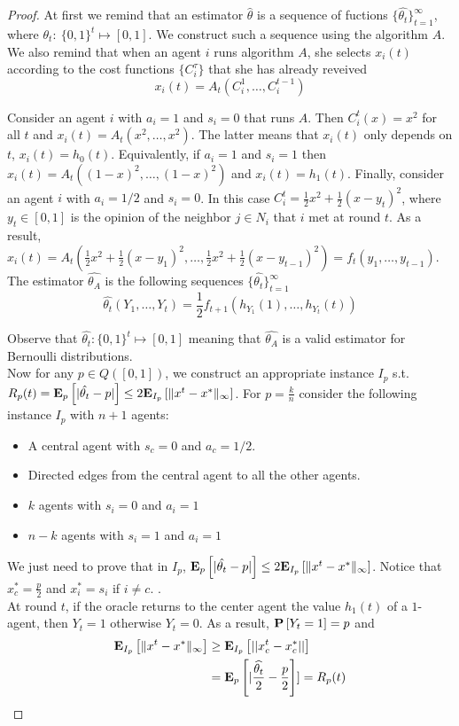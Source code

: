 \begin{proof}
At first we remind that an estimator $\hat{\theta}$ is a sequence of fuctions $\{\hat{\theta_t}\}_{t=1}^{\infty}$, where $\theta_t:~\{0,1\}^t\mapsto [0,1]$.  We construct such a sequence using the algorithm $A$.
We also remind that when an agent $i$ runs algorithm $A$, she selects $x_i(t)$ according to the cost functions $\{C_i^{\tau}\}$ that she has already reveived \[x_i(t)=A_t(C_i^1,\ldots,C_i^{t-1})\]

\noindent Consider an agent $i$ with $a_i=1$ and $s_i=0$ that runs $A$. Then $C_i^t(x)=x^2$ for all $t$ and $x_i(t)=A_t(x^2,\ldots,x^2)$.
The latter means that $x_i(t)$ only depends on $t$, $x_i(t)=h_0(t)$. Equivalently, if $a_i=1$ and $s_i=1$ then $x_i(t)=A_t((1-x)^2,\ldots,(1-x)^2)$ and $x_i(t)=h_1(t)$. Finally, consider an agent $i$ with $a_i=1/2$ and $s_i=0$. In this case $C_i^t = \frac{1}{2}x^2 + \frac{1}{2}(x-y_t)^2$, where $y_t \in [0,1]$ is the opinion of the neighbor $j\in N_i$ that $i$ met at
round $t$. As a result, $x_i(t)=A_t(\frac{1}{2}x^2+\frac{1}{2}(x-y_1)^2,\ldots,\frac{1}{2}x^2+\frac{1}{2}(x-y_{t-1})^2)=f_t(y_1,\ldots,y_{t-1})$. The estimator $\hat{\theta_A}$ is the following sequences $\{\hat{\theta_{t}}\}_{t=1}^{\infty}$ \[\hat{\theta_t}(Y_1,\ldots,Y_t) = \frac{1}{2}f_{t+1}(h_{Y_1}(1),\ldots,h_{Y_t}(t)) \]

\noindent Observe that $\hat{\theta_t}: \{0,1\}^t \mapsto [0,1]$ meaning that $\hat{\theta_A}$ is a valid estimator for Bernoulli distributions.\\

\noindent Now for any $p \in Q([0,1])$, we construct an appropriate instance $I_p$ s.t. $R_p(t)=\bm{\mathrm{E}}_{p} \left[ |\hat{\theta_t} - p| \right] \leq 2\bm{\mathrm{E}}_{I_p} \left[ \| x^t-x^* \|_{\infty} \right]$.
For $p=\frac{k}{n}$ consider the following instance $I_p$ with $n+1$ agents:
\begin{itemize}
 \item A central agent with $s_c=0$ and $a_c=1/2$.
 \item Directed edges from the central agent to all the other agents.
 \item $k$ agents with $s_i=0$ and $a_i=1$
 \item $n-k$ agents with $s_i=1$ and $a_i=1$
 \end{itemize}
We just need to prove that in $I_p$, $\bm{\mathrm{E}}_{p} \left[ |\hat{\theta_t}-p| \right] \leq 2\bm{\mathrm{E}}_{I_p} \left[ \| x^t-x^* \|_{\infty} \right]$. Notice that $x^*_c=\frac{p}{2}$ and $x^*_i=s_i$ if $i\neq c$. .\\
At round $t$, if the oracle returns to the center agent the value $h_1(t)$ of a $1$-agent, then $Y_t=1$ otherwise $Y_t=0$. As a result, $\bm{\mathrm{P}}\left[Y_t=1\right]=p$ and
\begin{align*}
 \bm{\mathrm{E}}_{I_p} \left[ \| x^t-x^* \|_{\infty} \right] &\geq \bm{\mathrm{E}}_{I_p} \left[ ||x^t_c-x^*_c|| \right]\\
 &= \bm{\mathrm{E}}_{p} \left[ |\frac{\widehat{\theta_t}}{2}-\frac{p}{2} \right]] = R_p(t)
\end{align*}
\end{proof}


